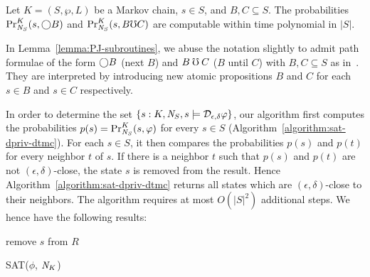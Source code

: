 \begin{lemma}
  Let $K = (S, \wp, L)$ be a Markov chain, $s
  \in S$, and $B, C \subseteq S$. The probabilities
  $\myPr{s}{K}{\neighbor{S}}{\gX B}$ and
  $\myPr{s}{K}{\neighbor{S}}{B \mho C}$
\hide{
  $\Pr[\{ \pi : K, \neighbor{K}, \pi \models B \buntil{n} C \textmd{
    with } \pi_0 = s \}]$
} are computable within time polynomial in
  $|S|$.
  \label{lemma:PJ-subroutines}
\end{lemma}

In Lemma~\ref{lemma:PJ-subroutines}, we abuse the notation slightly to
admit path formulae of the form $\gX B$ (next $B$) and
$B \guntil C$ ($B$ until $C$) with $B, C \subseteq S$ as
in~\cite{BK:08:PMC}. They are interpreted by introducing new atomic
propositions $B$ and $C$ for each $s \in B$ and $s \in C$
respectively. 

In order to determine the set $\{ s : K, \neighbor{S}, s \models
\dpriv{\epsilon}{\delta} \varphi \}$, our algorithm first computes
the probabilities $p (s) = \myPr{s}{K}{\neighbor{S}}{\varphi}$ for every
$s \in S$ (Algorithm~\ref{algorithm:sat-dpriv-dtmc}). For each $s \in S$,
it then compares the probabilities $p (s)$ and $p (t)$ for every
neighbor $t$ of $s$. If there is a neighbor $t$ such that $p (s)$ and
$p (t)$ are not $(\epsilon, \delta)$-close, the state $s$
is removed from the result. Hence
Algorithm~\ref{algorithm:sat-dpriv-dtmc} returns all states which are
$(\epsilon, \delta)$-close to their neighbors.
The algorithm requires at most $O
(|S|^2)$ additional steps. We hence have the following results:

\begin{algorithm}
  \begin{algorithmic}[1]
    \Match{$\phi$}
    \Case{$\X \Psi$}
    \EndCase
    \EndCase
    \EndMatch
        {remove $s$ from $R$}
        \EndIf
      \EndFor
    \EndFor

    \EndFunction
  \end{algorithmic}
  \caption{SAT($\phi$, $\neighbor{K}$)}
  \label{algorithm:sat-dpriv-dtmc}
\end{algorithm}

